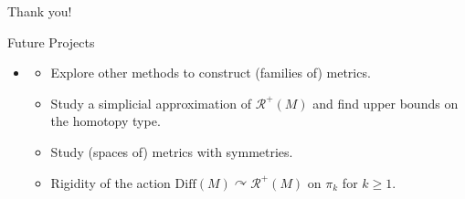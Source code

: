 \documentclass[10pt]{beamer}
\newcommand{\calR}{\mathcal{R}}
\newcommand{\actson}{\curvearrowright}
\newcommand{\diff}{{\mathrm{Diff}}}
\newtheorem*{Thm A}{Theorem A}
\newtheorem*{Thm B}{Theorem B}
\begin{document}
\begin{frame}[plain]
\centering
\vspace{2em}
\huge Thank you!
\vspace{1em}
\begin{exampleblock}{Future Projects}
\vspace{0.3em}
\begin{itemize}
\item\begin{itemize}
	\item Explore other methods to construct (families of) metrics.\vspace{1em}
	\item Study a simplicial approximation of $\calR^+(M)$ and find upper bounds on the homotopy type.\vspace{1em}
	\item Study (spaces of) metrics with symmetries.\vspace{1em}
	\item Rigidity of the action $\diff(M)\actson\calR^+(M)$ on $\pi_k$ for $k\ge1$.
\end{itemize}
\end{itemize}
\end{exampleblock}
\end{frame}
\end{document}
